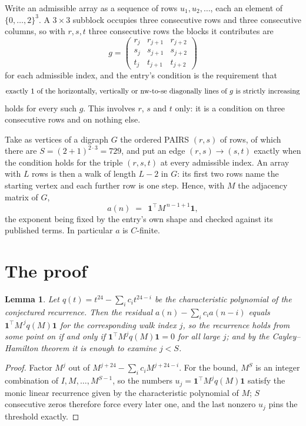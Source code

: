 \documentclass[11pt,a4paper]{article}
\theoremstyle{plain}
\newtheorem{lemma}[theorem]{Lemma}
\theoremstyle{definition}
\begin{document}
Write an admissible array as a sequence of rows $u_1,u_2,\dots$, each an element of
$\{0,\dots,2\}^{3}$. A $3\times3$ subblock occupies three consecutive rows and
three consecutive columns, so with $r,s,t$ three consecutive rows the blocks it
contributes are
\[
g=\begin{pmatrix}r_j&r_{j+1}&r_{j+2}\\ s_j&s_{j+1}&s_{j+2}\\ t_j&t_{j+1}&t_{j+2}\end{pmatrix}
\]
for each admissible index, and the entry's condition is the requirement that
\[
\text{exactly }1\text{ of the horizontally, vertically or nw-to-se diagonally lines of }g\text{ \text{is strictly increasing}}
\]
holds for every such $g$. This involves $r$, $s$ and $t$ only: it is a condition on
three consecutive rows and on nothing else.

Take as vertices of a digraph $G$ the ordered PAIRS $(r,s)$ of rows, of which there are
$S=(2+1)^{2\cdot3}=729$, and put an edge $(r,s)\to(s,t)$ exactly when the condition
holds for the triple $(r,s,t)$ at every admissible index. An array with $L$ rows is then a
walk of length $L-2$ in $G$: its first two rows name the starting vertex and each further
row is one step. Hence, with $M$ the adjacency matrix of $G$,
\[
a(n)\;=\;\,\mathbf{1}^{\!\top}M^{\,n-1+1}\mathbf{1},
\]
the exponent being fixed by the entry's own shape and checked against its published terms.
In particular $a$ is $C$-finite.

\section{The proof}

\begin{lemma}\label{lem:crit}
Let $q(t)=t^{24}-\sum_i c_it^{24-i}$ be the characteristic polynomial of the
conjectured recurrence. Then the residual $a(n)-\sum_ic_ia(n-i)$ equals
$\mathbf{1}^{\!\top}M^{\,j}q(M)\mathbf{1}$ for the corresponding walk index
$j$, so the recurrence holds from some point on if and only if
$\mathbf{1}^{\!\top}M^{j}q(M)\mathbf{1}=0$ for all large $j$; and by the
Cayley--Hamilton theorem it is enough to examine $j<S$.
\end{lemma}

\begin{proof}
Factor $M^{j}$ out of $M^{j+24}-\sum_ic_iM^{j+24-i}$. For the bound, $M^{S}$
is an integer combination of $I,M,\dots,M^{S-1}$, so the numbers
$u_j=\mathbf{1}^{\!\top}M^{j}q(M)\mathbf{1}$ satisfy the monic linear recurrence given by
the characteristic polynomial of $M$; $S$ consecutive zeros therefore force every later one,
and the last nonzero $u_j$ pins the threshold exactly.
\end{proof}
\end{document}
